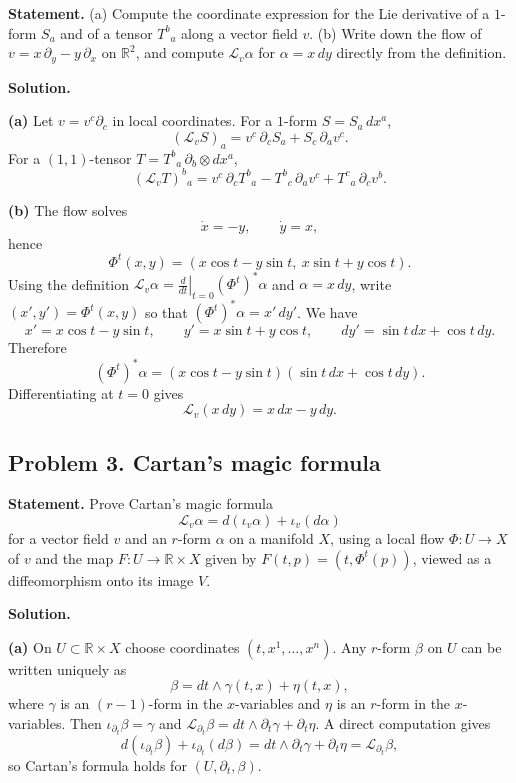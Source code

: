 \documentclass[12pt,a4paper]{article}
\theoremstyle{plain}
\theoremstyle{definition}      %
\begin{document}
\textbf{Statement.}
(a) Compute the coordinate expression for the Lie derivative of a $1$-form $S_a$ and of a tensor $T^b{}_a$ along a vector field $v$.
(b) Write down the flow of $v=x\,\partial_y-y\,\partial_x$ on $\mathbb R^2$, and compute $\mathcal L_v\alpha$ for $\alpha=x\,dy$
directly from the definition.

\textbf{Solution.}

\textbf{(a)} Let $v=v^c\partial_c$ in local coordinates.
For a $1$-form $S=S_a\,dx^a$,
\[
(\mathcal L_v S)_a = v^c\,\partial_c S_a + S_c\,\partial_a v^c.
\]
For a $(1,1)$-tensor $T=T^b{}_a\,\partial_b\otimes dx^a$,
\[
(\mathcal L_v T)^b{}_a
=
v^c\,\partial_c T^b{}_a
-
T^b{}_c\,\partial_a v^c
+
T^c{}_a\,\partial_c v^b.
\]

\textbf{(b)} The flow solves
\[
\dot x=-y,\qquad \dot y=x,
\]
hence
\[
\Phi^t(x,y)=(x\cos t-y\sin t,\ x\sin t+y\cos t).
\]
Using the definition $\mathcal L_v\alpha=\left.\frac{d}{dt}\right|_{t=0}(\Phi^t)^*\alpha$ and $\alpha=x\,dy$, write
$(x',y')=\Phi^t(x,y)$ so that $(\Phi^t)^*\alpha=x'\,dy'$.
We have
\[
x'=x\cos t-y\sin t,\qquad y'=x\sin t+y\cos t,\qquad dy'=\sin t\,dx+\cos t\,dy.
\]
Therefore
\[
(\Phi^t)^*\alpha=(x\cos t-y\sin t)(\sin t\,dx+\cos t\,dy).
\]
Differentiating at $t=0$ gives
\[
\mathcal L_v(x\,dy)=x\,dx-y\,dy.
\]


\bigskip
\subsection*{Problem 3. Cartan's magic formula}

\textbf{Statement.}
Prove Cartan's magic formula
\[
\mathcal L_v\alpha = d(\iota_v\alpha)+\iota_v(d\alpha)
\]
for a vector field $v$ and an $r$-form $\alpha$ on a manifold $X$, using a local flow $\Phi:U\to X$ of $v$ and
the map $F:U\to\mathbb R\times X$ given by $F(t,p)=(t,\Phi^t(p))$, viewed as a diffeomorphism onto its image $V$.

\textbf{Solution.}

\textbf{(a)} On $U\subset \mathbb R\times X$ choose coordinates $(t,x^1,\dots,x^n)$.
Any $r$-form $\beta$ on $U$ can be written uniquely as
\[
\beta = dt\wedge \gamma(t,x)+\eta(t,x),
\]
where $\gamma$ is an $(r-1)$-form in the $x$-variables and $\eta$ is an $r$-form in the $x$-variables.
Then $\iota_{\partial_t}\beta=\gamma$ and $\mathcal L_{\partial_t}\beta=dt\wedge \partial_t\gamma+\partial_t\eta$.
A direct computation gives
\[
d(\iota_{\partial_t}\beta)+\iota_{\partial_t}(d\beta)
=
dt\wedge \partial_t\gamma+\partial_t\eta
=
\mathcal L_{\partial_t}\beta,
\]
so Cartan's formula holds for $(U,\partial_t,\beta)$.
\end{document}
